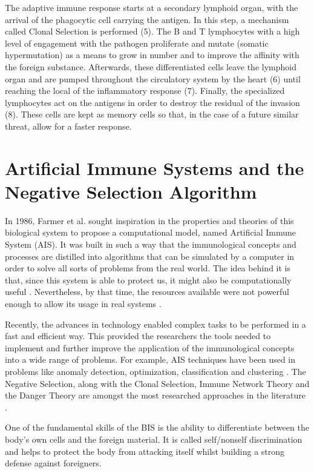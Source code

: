 The adaptive immune response starts at a secondary lymphoid organ, with the arrival of the phagocytic cell carrying the antigen. In this step, a mechanism called Clonal Selection is performed (5). The B and T lymphocytes with a high level of engagement with the pathogen proliferate and mutate (somatic hypermutation) as a means to grow in number and to improve the affinity with the foreign substance. Afterwards, these differentiated cells leave the lymphoid organ and are pumped throughout the circulatory system by the heart (6) until reaching the local of the inflammatory response (7). Finally, the specialized lymphocytes act on the antigens in order to destroy the residual of the invasion (8). These cells are kept as memory cells so that, in the case of a future similar threat, allow for a faster response. 

\section{Artificial Immune Systems and the Negative Selection Algorithm} \label{sec:bgNSA}

In 1986, Farmer et al. \cite{ImmuneSysAdapML1986} sought inspiration in the properties and theories of this biological system to propose a computational model, named Artificial Immune System (AIS). It was built in such a way that the immunological concepts and processes are distilled into algorithms that can be simulated by a computer in order to solve all sorts of problems from the real world. The idea behind it is that, since this system is able to protect us, it might also be computationally useful \cite{EvaluateAIS2005}. Nevertheless, by that time, the resources available were not powerful enough to allow its usage in real systems \cite{AdaptiveImmunitySAS2021}.

Recently, the advances in technology enabled complex tasks to be performed in a fast and efficient way. This provided the researchers the tools needed to implement and further improve the application of the immunological concepts into a wide range of problems. For example, AIS techniques have been used in problems like anomaly detection, optimization, classification and clustering \cite{AISSOA2015}. The Negative Selection, along with the Clonal Selection, Immune Network Theory and the Danger Theory are amongst the most researched approaches in the literature \cite{NSAResearch2021}.

One of the fundamental skills of the BIS is the ability to differentiate between the body's own cells and the foreign material. It is called self/nonself discrimination \cite{NSAResearch2021} and helps to protect the body from attacking itself whilst building a strong defense against foreigners. 

